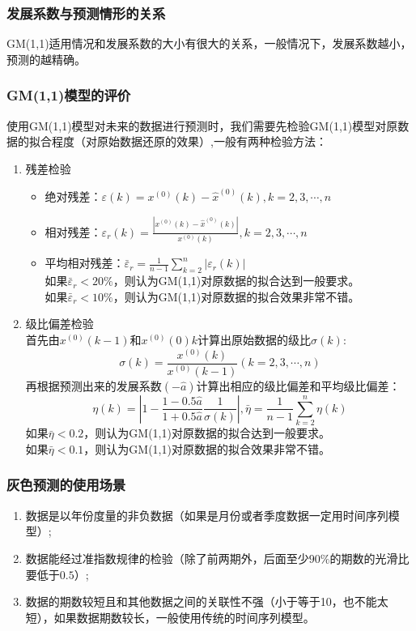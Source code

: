 \documentclass[openany]{progbookcn}
\begin{document}
\subsubsection{发展系数与预测情形的关系}
\indent GM(1,1)适用情况和发展系数的大小有很大的关系，一般情况下，发展系数越小，预测的越精确。
\subsubsection{GM(1,1)模型的评价}
\indent 使用GM(1,1)模型对未来的数据进行预测时，我们需要先检验GM(1,1)模型对原数据的拟合程度（对原始数据还原的效果）,一般有两种检验方法：
\begin{enumerate}
\item 残差检验
\begin{itemize}
\item 绝对残差：$\varepsilon (k) = {x^{(0)}}(k) - {\hat x^{(0)}}(k),k = 2,3, \cdots ,n$
\item 相对残差：${\varepsilon _r}(k) = \frac{{|{x^{(0)}}(k) - {{\hat x}^{(0)}}(k)|}}{{{x^{(0)}}(k)}},k = 2,3, \cdots ,n$
\item 平均相对残差：${\bar \varepsilon _r} = \frac{1}{{n - 1}}\sum\limits_{k = 2}^n {|{\varepsilon _r}(k)|} $\\
\indent 如果${\bar \varepsilon _r}<20\%$，则认为GM(1,1)对原数据的拟合达到一般要求。\\
\indent 如果${\bar \varepsilon _r}<10\%$，则认为GM(1,1)对原数据的拟合效果非常不错。
\end{itemize}
\item 级比偏差检验\\
\indent 首先由$x^{(0)}(k-1)$和$x^{(0)}(0)k$计算出原始数据的级比$\sigma(k)$:
\begin{equation}\nonumber
\sigma (k) = \frac{{{x^{(0)}}(k)}}{{{x^{(0)}}(k - 1)}}(k = 2,3, \cdots ,n)
\end{equation}
\indent 再根据预测出来的发展系数$(-{\hat a})$计算出相应的级比偏差和平均级比偏差：
\begin{equation}\nonumber
\eta (k) = \left| {1 - \frac{{1 - 0.5\hat a}}{{1 + 0.5\hat a}}\frac{1}{{\sigma (k)}}} \right|,\bar \eta  = \frac{1}{{n - 1}}\sum\limits_{k = 2}^n {\eta (k)} 
\end{equation}
\indent 如果${\bar\eta}<0.2$，则认为GM(1,1)对原数据的拟合达到一般要求。\\
\indent 如果${\bar\eta}<0.1$，则认为GM(1,1)对原数据的拟合效果非常不错。
\end{enumerate}
\subsubsection{灰色预测的使用场景}
\begin{enumerate}
\item 数据是以年份度量的非负数据（如果是月份或者季度数据一定用时间序列模型）;
\item 数据能经过准指数规律的检验（除了前两期外，后面至少$90\%$的期数的光滑比要低于$0.5$）;
\item 数据的期数较短且和其他数据之间的关联性不强（小于等于10，也不能太短），如果数据期数较长，一般使用传统的时间序列模型。
\end{enumerate}
\end{document}
